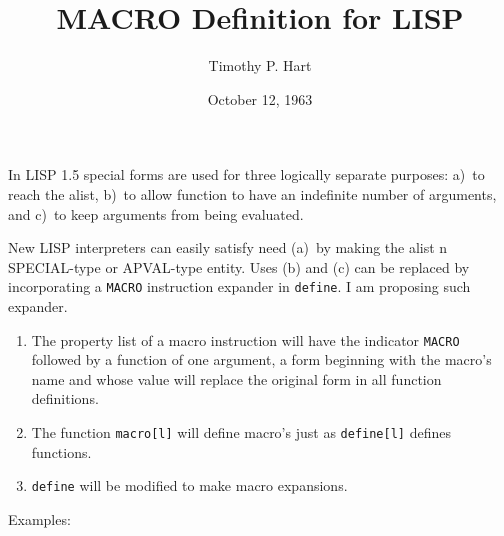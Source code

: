 \documentclass{tufte-handout}
\title{MACRO Definition for LISP}
\author[Timothy P. Hart]{Timothy P. Hart}
\date{October 12, 1963} %
\begin{document}
\maketitle%

In LISP 1.5 special forms are used for three logically separate purposes: a)~to
reach the alist, b)~to allow function to have an indefinite number of arguments,
and c)~to keep arguments from being evaluated.

New LISP interpreters can easily satisfy need (a)~by making the alist n
SPECIAL-type or APVAL-type entity. Uses (b) and (c) can be replaced by
incorporating a \texttt{MACRO} instruction expander in \texttt{define}. I am
proposing such expander.

\begin{enumerate}
\item The property list of a macro instruction will have the indicator
  \texttt{MACRO} followed by a function of one argument, a form beginning with
  the macro's name and whose value will replace the original form in all
  function definitions.
\item The function \texttt{macro[l]} will define macro's just as
  \texttt{define[l]} defines functions.
\item \texttt{define} will be modified to make macro expansions.
\end{enumerate}

Examples:
\end{document}
